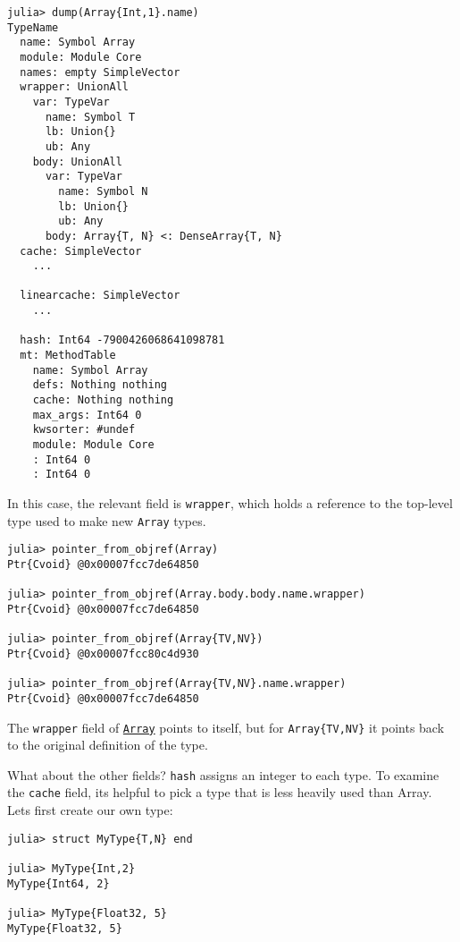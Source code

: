 \begin{verbatim}
julia> dump(Array{Int,1}.name)
TypeName
  name: Symbol Array
  module: Module Core
  names: empty SimpleVector
  wrapper: UnionAll
    var: TypeVar
      name: Symbol T
      lb: Union{}
      ub: Any
    body: UnionAll
      var: TypeVar
        name: Symbol N
        lb: Union{}
        ub: Any
      body: Array{T, N} <: DenseArray{T, N}
  cache: SimpleVector
    ...

  linearcache: SimpleVector
    ...

  hash: Int64 -7900426068641098781
  mt: MethodTable
    name: Symbol Array
    defs: Nothing nothing
    cache: Nothing nothing
    max_args: Int64 0
    kwsorter: #undef
    module: Module Core
    : Int64 0
    : Int64 0
\end{verbatim}



In this case, the relevant field is \texttt{wrapper}, which holds a reference to the top-level type used to make new \texttt{Array} types.




\begin{verbatim}
julia> pointer_from_objref(Array)
Ptr{Cvoid} @0x00007fcc7de64850

julia> pointer_from_objref(Array.body.body.name.wrapper)
Ptr{Cvoid} @0x00007fcc7de64850

julia> pointer_from_objref(Array{TV,NV})
Ptr{Cvoid} @0x00007fcc80c4d930

julia> pointer_from_objref(Array{TV,NV}.name.wrapper)
Ptr{Cvoid} @0x00007fcc7de64850
\end{verbatim}



The \texttt{wrapper} field of \hyperlink{15492651498431872487}{\texttt{Array}} points to itself, but for \texttt{Array\{TV,NV\}} it points back to the original definition of the type.



What about the other fields? \texttt{hash} assigns an integer to each type.  To examine the \texttt{cache} field, it{\textquotesingle}s helpful to pick a type that is less heavily used than Array. Let{\textquotesingle}s first create our own type:




\begin{verbatim}
julia> struct MyType{T,N} end

julia> MyType{Int,2}
MyType{Int64, 2}

julia> MyType{Float32, 5}
MyType{Float32, 5}
\end{verbatim}



